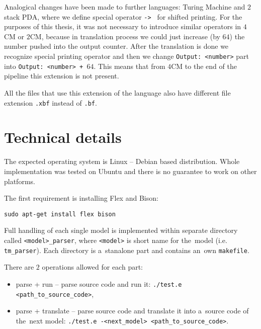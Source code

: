 \documentclass[english,shortabstract,mgr]{iithesis}
\begin{document}
Analogical changes have been made to further languages: Turing Machine and $2$
stack PDA, where we define special operator \texttt{->~} for shifted printing.
For the purposes of this thesis, it was not necessary to introduce similar
operators in $4$CM or $2$CM, because in translation process we could just
increase (by $64$) the number pushed into the output counter. After the translation
is done we recognize special printing operator and then we change \texttt{Output: <number>}
part into \texttt{Output:~<number>~+~$64$}. This means that from $4$CM
to the end of the pipeline this extension is not present.

All the files that use this extension of the language also have different file
extension \texttt{.xbf} instead of \texttt{.bf}.

\section{Technical details}

The expected operating system is Linux -- Debian based distribution. Whole implementation
was tested on Ubuntu and there is no guarantee to work on other platforms.

The first requirement is installing Flex and Bison:

\texttt{sudo apt-get install flex bison}

Full handling of each single model is implemented within separate directory called
\texttt{<model>\_parser}, where \texttt{<model>} is short name for the~model
(i.e. \texttt{tm\_parser}). Each directory is a~stanalone part and contains
an~own \texttt{makefile}.

There are $2$ operations allowed for each part:
\begin{itemize}
  \item parse + run -- parse source code and run it: \texttt{./test.e <path\_to\_source\_code>},
  \item parse + translate -- parse source code and translate it into a~source code
      of the~next model: \texttt{./test.e -<next\_model> <path\_to\_source\_code>}.
\end{itemize}
\end{document}
